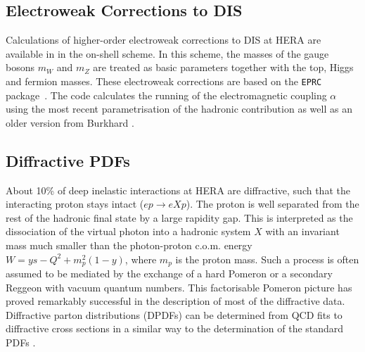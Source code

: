 \subsection{Electroweak Corrections to DIS}
Calculations of higher-order electroweak corrections to DIS at 
HERA are available in \fitter in the on-shell scheme. In this scheme, the
masses of the gauge bosons $m_W$ and 
$m_Z$ are treated as basic parameters together with the top, 
Higgs and fermion masses.
These electroweak corrections 
are based on the \texttt{EPRC} package~\cite{SpiesbergerPrivComm}.
The code calculates the running of the electromagnetic coupling $\alpha$ using the most recent parametrisation
of the hadronic contribution
\cite{Jegerlehner} as well as 
an older version from Burkhard \cite{Burkhard}.



\subsection{Diffractive PDFs}

\newcommand{\asotp}{\ensuremath{\frac{\alpha_{\rm s}}{2\pi}}}
\newcommand{\Sgl}[1]{\ensuremath{\tilde f_{#1+}}}
\newcommand{\Pom}{{I\!P}}
\newcommand{\Reg}{{I\!R}}
\newcommand{\xpom}{$x_{I\!P}$}
\newcommand{\xP}{x_\Pom}


About 10\% of deep inelastic interactions at HERA are diffractive, such that the interacting proton stays intact ($ep\to eXp$). 
The proton is well separated from the 
rest of the hadronic final state by a large rapidity gap.  
This is interpreted as the dissociation of the virtual photon into a
hadronic system $X$ with an invariant mass much 
smaller than the photon-proton c.o.m. energy $W=ys-Q^2+m_p^2(1-y)$, where $m_p$ is the proton mass. Such a process is often assumed to be mediated by the exchange of a hard Pomeron 
or a secondary Reggeon with vacuum quantum numbers. 
This factorisable Pomeron picture has proved remarkably successful in the description of most of the diffractive data.
Diffractive parton distributions (DPDFs) 
can be determined from QCD fits to diffractive cross sections in a similar way to the determination of the standard PDFs \cite{Collins:1997sr}.

%

